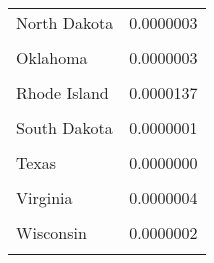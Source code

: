 \begin{table}[H]
\begin{tabular}[t]{lr}
North Dakota & 0.0000003\\
\cellcolor{gray!6}{Ohio} & \cellcolor{gray!6}{0.0000007}\\
Oklahoma & 0.0000003\\
\addlinespace
\cellcolor{gray!6}{Pennsylvania} & \cellcolor{gray!6}{0.0000002}\\
Rhode Island & 0.0000137\\
\cellcolor{gray!6}{South Carolina} & \cellcolor{gray!6}{0.0000028}\\
South Dakota & 0.0000001\\
\cellcolor{gray!6}{Tennessee} & \cellcolor{gray!6}{0.0000004}\\
\addlinespace
Texas & 0.0000000\\
\cellcolor{gray!6}{Utah} & \cellcolor{gray!6}{0.2810486}\\
Virginia & 0.0000004\\
\cellcolor{gray!6}{West Virginia} & \cellcolor{gray!6}{0.0000296}\\
Wisconsin & 0.0000002\\
\addlinespace
\cellcolor{gray!6}{Wyoming} & \cellcolor{gray!6}{0.0000001}\\
\bottomrule
\end{tabular}
\end{table}
